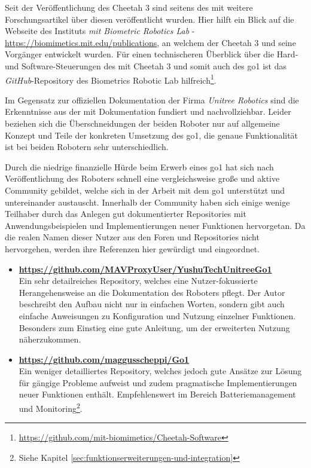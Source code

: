 Seit der Veröffentlichung des Cheetah \num{3} sind seitens des \gls{mit} weitere Forschungsartikel über diesen veröffentlicht wurden.
Hier hilft ein Blick auf die Webseite des Instituts \emph{\gls{mit} Biometric Robotics Lab} - \url{https://biomimetics.mit.edu/publications},
an welchem der Cheetah \num{3} und seine Vorgänger entwickelt wurden.
Für einen technischeren Überblick über die Hard- und Software-Steuerungen des \gls{mit} Cheetah 3 und somit auch des \gls{go1}
ist das \emph{GitHub}-Repository des Biometrics Robotic Lab hilfreich\footnote{\url{https://github.com/mit-biomimetics/Cheetah-Software}}.

Im Gegensatz zur offiziellen Dokumentation der Firma \emph{Unitree Robotics} sind die Erkenntnisse aus der \gls{mit}
Dokumentation fundiert und nachvollziehbar.
Leider beziehen sich die Überschneidungen der beiden Roboter nur auf allgemeine Konzept und Teile der konkreten Umsetzung des
\gls{go1}, die genaue Funktionalität ist bei beiden Robotern sehr unterschiedlich.


Durch die niedrige finanzielle Hürde beim Erwerb eines \gls{go1} hat sich nach Veröffentlichung des Roboters schnell eine
vergleichsweise große und aktive Community gebildet, welche sich in der Arbeit mit dem \gls{go1} unterstützt und untereinander
austauscht.
Innerhalb der Community haben sich einige wenige Teilhaber durch das Anlegen gut dokumentierter Repositories mit Anwendungsbeispielen
und Implementierungen neuer Funktionen hervorgetan.
Da die realen Namen dieser Nutzer aus den Foren und Repositories nicht hervorgehen, werden ihre Referenzen hier gewürdigt
und eingeordnet.

\begin{itemize}
    \item \textbf{\url{https://github.com/MAVProxyUser/YushuTechUnitreeGo1}}\\
    Ein sehr detailreiches Repository, welches eine Nutzer-fokussierte Herangehensweise an die Dokumentation des Roboters
    pflegt.
    Der Autor beschreibt den Aufbau nicht nur in einfachen Worten, sondern gibt auch einfache Anweisungen zu Konfiguration
    und Nutzung einzelner Funktionen.
    Besonders zum Einstieg eine gute Anleitung, um der erweiterten Nutzung näherzukommen.
    \item \textbf{\url{https://github.com/maggusscheppi/Go1}}\\
    Ein weniger detailliertes Repository, welches jedoch gute Ansätze zur Lösung für gängige Probleme aufweist und zudem
    pragmatische Implementierungen neuer Funktionen enthält.
    Empfehlenswert im Bereich Batteriemanagement und Monitoring\footnote{Siehe Kapitel \ref{sec:funktionserweiterungen-und-integration}}.
\end{itemize}


